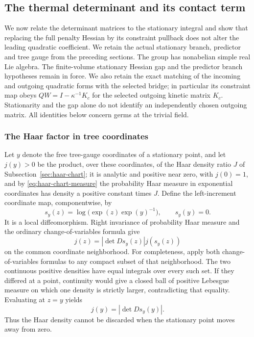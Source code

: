 \subsection{The thermal determinant and its contact term}
\label{sec:ex-thermal-contact-cancellation}

We now relate the determinant matrices to the stationary integral and
show that replacing the full penalty Hessian by its constraint pullback
does not alter the leading quadratic coefficient. We retain the actual
stationary branch, predictor and tree gauge from the preceding sections.
The group has nonabelian simple real Lie algebra. The finite-volume
stationary Hessian gap and the predictor branch hypotheses remain in
force. We also retain the exact matching of the incoming and outgoing
quadratic forms with the selected bridge; in particular its constraint
map obeys $QW=I-\kappa^{-1}K_c$ for the selected outgoing kinetic
matrix $K_c$. Stationarity and the gap alone do not identify an
independently chosen outgoing matrix. All identities below concern
germs at the trivial field.

\subsubsection{The Haar factor in tree coordinates}
Let $y$ denote the free tree-gauge coordinates of a stationary point,
and let $j(y)>0$ be the product, over these coordinates, of the Haar
density ratio $J$ of Subsection~\ref{sec:haar-chart}; it is analytic and
positive near zero, with $j(0)=1$, and by
\eqref{eq:haar-chart-measure} the probability Haar measure in
exponential coordinates has density a positive constant times $J$.
Define the left-increment coordinate map, componentwise, by
\[
 s_y(z)=\log\bigl(\exp(z)\exp(y)^{-1}\bigr),\qquad s_y(y)=0.
\]
It is a local diffeomorphism. Right invariance of probability Haar
measure and the ordinary change-of-variables formula give
\[
                       j(z)=|\det Ds_y(z)|j(s_y(z))
\]
on the common coordinate neighborhood. For completeness, apply both
change-of-variables formulas to any compact subset of that neighborhood.
The two continuous positive densities have equal integrals over every
such set. If they differed at a point, continuity would give a closed
ball of positive Lebesgue measure on which one density is strictly
larger, contradicting that equality. Evaluating at $z=y$ yields
\begin{equation}\label{eq:ex-haar-left-jacobian}
                         j(y)=|\det Ds_y(y)|.
\end{equation}
Thus the Haar density cannot be discarded when the stationary point
moves away from zero.

